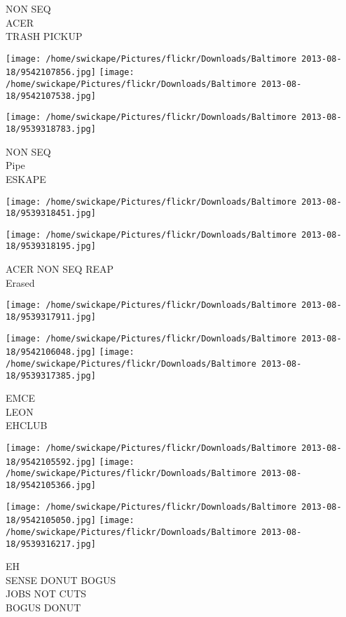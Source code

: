 \documentclass[10pt,letterpaper]{article}
\begin{document}
NON SEQ\\
ACER\\
TRASH PICKUP
\pagebreak

\texttt{[image: /home/swickape/Pictures/flickr/Downloads/Baltimore 2013-08-18/9542107856.jpg]}
\texttt{[image: /home/swickape/Pictures/flickr/Downloads/Baltimore 2013-08-18/9542107538.jpg]}

\vspace{0.25in}
\texttt{[image: /home/swickape/Pictures/flickr/Downloads/Baltimore 2013-08-18/9539318783.jpg]}

NON SEQ\\
Pipe\\
ESKAPE
\pagebreak

\texttt{[image: /home/swickape/Pictures/flickr/Downloads/Baltimore 2013-08-18/9539318451.jpg]}

\vspace{0.25in}
\texttt{[image: /home/swickape/Pictures/flickr/Downloads/Baltimore 2013-08-18/9539318195.jpg]}

ACER NON SEQ REAP\\
Erased
\pagebreak

\texttt{[image: /home/swickape/Pictures/flickr/Downloads/Baltimore 2013-08-18/9539317911.jpg]}

\vspace{0.25in}
\texttt{[image: /home/swickape/Pictures/flickr/Downloads/Baltimore 2013-08-18/9542106048.jpg]}
\texttt{[image: /home/swickape/Pictures/flickr/Downloads/Baltimore 2013-08-18/9539317385.jpg]}

EMCE\\
LEON\\
EHCLUB
\pagebreak

\texttt{[image: /home/swickape/Pictures/flickr/Downloads/Baltimore 2013-08-18/9542105592.jpg]}
\texttt{[image: /home/swickape/Pictures/flickr/Downloads/Baltimore 2013-08-18/9542105366.jpg]}

\texttt{[image: /home/swickape/Pictures/flickr/Downloads/Baltimore 2013-08-18/9542105050.jpg]}
\texttt{[image: /home/swickape/Pictures/flickr/Downloads/Baltimore 2013-08-18/9539316217.jpg]}

EH\\
SENSE DONUT BOGUS\\
JOBS NOT CUTS\\
BOGUS DONUT
\pagebreak
\end{document}
